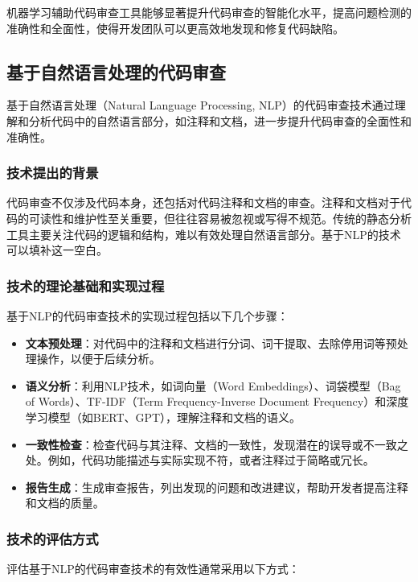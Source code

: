 \documentclass{article}
\begin{document}
机器学习辅助代码审查工具能够显著提升代码审查的智能化水平，提高问题检测的准确性和全面性，使得开发团队可以更高效地发现和修复代码缺陷。

\subsection{基于自然语言处理的代码审查}

基于自然语言处理（Natural Language Processing, NLP）的代码审查技术通过理解和分析代码中的自然语言部分，如注释和文档，进一步提升代码审查的全面性和准确性。

\subsubsection{技术提出的背景}

代码审查不仅涉及代码本身，还包括对代码注释和文档的审查。注释和文档对于代码的可读性和维护性至关重要，但往往容易被忽视或写得不规范。传统的静态分析工具主要关注代码的逻辑和结构，难以有效处理自然语言部分。基于NLP的技术可以填补这一空白。

\subsubsection{技术的理论基础和实现过程}

基于NLP的代码审查技术的实现过程包括以下几个步骤：

\begin{itemize}
    \item \textbf{文本预处理}：对代码中的注释和文档进行分词、词干提取、去除停用词等预处理操作，以便于后续分析。
    \item \textbf{语义分析}：利用NLP技术，如词向量（Word Embeddings）、词袋模型（Bag of Words）、TF-IDF（Term Frequency-Inverse Document Frequency）和深度学习模型（如BERT、GPT），理解注释和文档的语义。
    \item \textbf{一致性检查}：检查代码与其注释、文档的一致性，发现潜在的误导或不一致之处。例如，代码功能描述与实际实现不符，或者注释过于简略或冗长。
    \item \textbf{报告生成}：生成审查报告，列出发现的问题和改进建议，帮助开发者提高注释和文档的质量。
\end{itemize}

\subsubsection{技术的评估方式}

评估基于NLP的代码审查技术的有效性通常采用以下方式：
\end{document}
